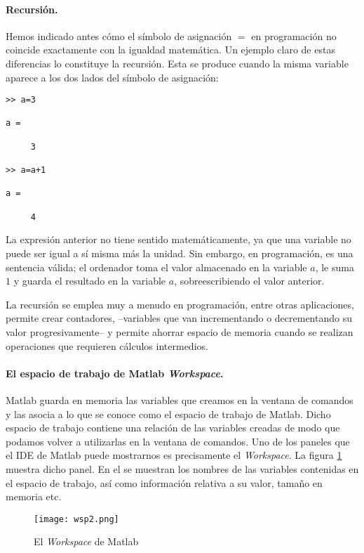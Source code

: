 \paragraph*{Recursión.}  Hemos indicado antes cómo el símbolo de asignación $=$ en programación no coincide exactamente con la igualdad matemática. Un ejemplo claro de estas diferencias lo constituye la recursión. Esta se produce cuando la misma variable aparece a los dos lados del símbolo de asignación:
\begin{verbatim}
>> a=3

a =

     3

>> a=a+1

a =

     4
\end{verbatim} 
La expresión anterior no tiene sentido matemáticamente, ya que una variable no puede ser igual a sí misma más la unidad. Sin embargo, en programación, es  una sentencia válida; el ordenador toma el valor almacenado en la variable $a$, le suma $1$ y guarda el resultado en la variable $a$, sobreescribiendo el valor anterior.

La recursión se emplea muy a menudo en programación, entre otras aplicaciones, permite crear contadores, --variables que van incrementando o decrementando su valor progresivamente--  y permite ahorrar espacio de memoria cuando se realizan operaciones que requieren cálculos intermedios.

\paragraph*{El espacio de trabajo de Matlab \emph{Workspace}.}  Matlab guarda en memoria las variables que creamos en la ventana de comandos y las asocia a lo que se conoce como el espacio de trabajo de Matlab. Dicho espacio de trabajo contiene una relación de las variables creadas de modo que podamos volver a utilizarlas en la ventana de comandos. Uno de los paneles que el IDE de Matlab puede mostrarnos es precisamente el \emph{Workspace}. La figura \ref{fig:wsp} muestra dicho panel.  En el se muestran los nombres de las variables contenidas en el espacio de trabajo, así como información relativa a su valor, tamaño en memoria etc.


\begin{figure}[h]
	\centering
		\texttt{[image: wsp2.png]}
	\caption{El \emph{Workspace} de Matlab}
	\label{fig:wsp}
\end{figure}

